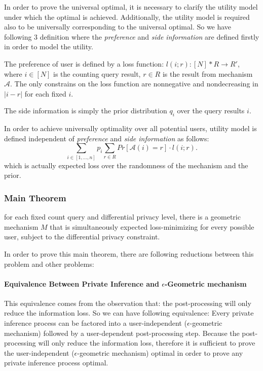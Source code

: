 \documentclass{article}
\begin{document}
%
In order to prove the universal optimal, it is necessary to clarify the utility model under which the optimal is achieved.
Additionally, the utility model is required also to be universally corresponding to the universal optimal. 
So we have following 3 definition where 
the \emph{preference} and \emph{side information} are defined firstly in order to model the utility.
%
\begin{defn}[preference]
The preference of user is defined by a loss function: $l(i; r): [N] * R \rightarrow R'$,
where $i \in [N]$ is the counting query result, $r \in R$ is the result from mechanism $\mathcal{A}$.
The only constrains on the loss function are nonnegative and nondecreasing in $|i - r|$ for each fixed $i$. 
\end{defn}

\begin{defn}
The side information is simply the prior distribution $q_i$ over the query results $i$.
\end{defn}

\begin{defn}
In order to achieve universally optimality over all potential users, utility model is defined independent
of \emph{preference} and \emph{side information} as follows:
\[
\sum_{i \in [1,\ldots, n]}p_i \sum_{r \in R}
Pr[\mathcal{A}(i) = r] \cdot l(i;r).
\]
which is actually expected loss over the randomness of the mechanism and the prior.
%
\end{defn}
%
%
%
%
\subsubsection{Main Theorem}
%
\begin{thm}
for each fixed count query and differential privacy level,
there is a geometric mechanism 
$M$ that is simultaneously expected loss-minimizing for every possible user,
subject to the differential privacy constraint.
\end{thm}
%
In order to prove this main theorem, there are following reductions between this problem and other problems:
\paragraph{Equivalence Between Private Inference and $\epsilon$-Geometric mechanism}
%
This equivalence comes from the observation that: the post-processing will only reduce the information loss.
So we can have following equivalence:
Every private inference process can be factored into a user-independent ($\epsilon$-geometric mechanism) followed by a user-dependent post-processing step.
Because the post-processing will only reduce the information loss, 
therefore it is sufficient to prove the user-independent ($\epsilon$-geometric mechanism) 
optimal in order to prove any private inference process optimal. 
\end{document}
